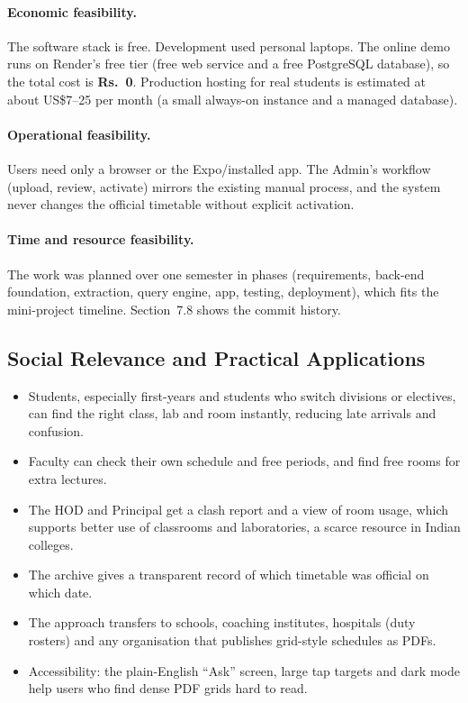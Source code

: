 \paragraph{Economic feasibility.}
The software stack is free. Development used personal laptops. The online demo runs on Render's free
tier (free web service and a free PostgreSQL database), so the total cost is
\textbf{Rs.~0}. Production hosting for real students is estimated at about
US\$7--25 per month (a small always-on instance and a managed database).

\paragraph{Operational feasibility.}
Users need only a browser or the Expo/installed app. The Admin's workflow (upload, review,
activate) mirrors the existing manual process, and the system never changes the official timetable
without explicit activation.

\paragraph{Time and resource feasibility.}
The work was planned over one semester in phases (requirements, back-end foundation, extraction,
query engine, app, testing, deployment), which fits the mini-project timeline. Section~7.8 shows the
commit history.

\subsection{Social Relevance and Practical Applications}
\begin{itemize}
\item Students, especially first-years and students who switch divisions or electives, can find the
      right class, lab and room instantly, reducing late arrivals and confusion.
\item Faculty can check their own schedule and free periods, and find free rooms for extra lectures.
\item The HOD and Principal get a clash report and a view of room usage, which supports better use of
      classrooms and laboratories, a scarce resource in Indian colleges.
\item The archive gives a transparent record of which timetable was official on which date.
\item The approach transfers to schools, coaching institutes, hospitals (duty rosters) and any
      organisation that publishes grid-style schedules as PDFs.
\item Accessibility: the plain-English ``Ask'' screen, large tap targets and dark mode help users who
      find dense PDF grids hard to read.
\end{itemize}


